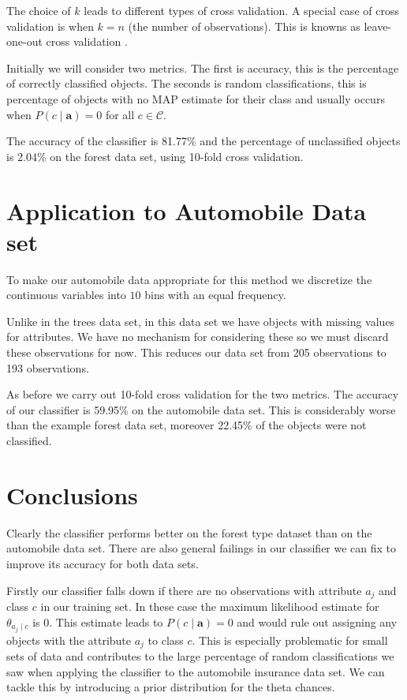 The choice of $k$ leads to different types of cross validation.
A special case of cross validation is when $k=n$ (the number of observations).
This is knowns as leave-one-out cross validation \cite{Priddy05}.

Initially we will consider two metrics.
The first is accuracy, this is the percentage of correctly classified objects.
The seconds is random classifications, this is percentage of objects with no MAP estimate for their class and usually occurs when $P(c \mid \mathbf{a}) = 0$ for all $c \in \mathcal{C}$.

The accuracy of the classifier is 81.77\% and the percentage of unclassified objects is 2.04\% on the forest data set, using 10-fold cross validation.

\section{Application to Automobile Data set}

To make our automobile data appropriate for this method we discretize the continuous variables into $10$ bins with an equal frequency.

Unlike in the trees data set, in this data set we have objects with missing values for attributes.
We have no mechanism for considering these so we must discard these observations for now.
This reduces our data set from 205 observations to 193 observations.

As before we carry out 10-fold cross validation for the two metrics.
The accuracy of our classifier is 59.95\% on the automobile data set.
This is considerably worse than the example forest data set, moreover 22.45\% of the objects were not classified.

\section{Conclusions}

Clearly the classifier performs better on the forest type dataset than on the automobile data set.
There are also general failings in our classifier we can fix to improve its accuracy for both data sets.

Firstly our classifier falls down if there are no observations with attribute $a_j$ and class $c$ in our training set.
In these case the maximum likelihood estimate for $\theta_{a_j \mid c}$ is $0$.
This estimate leads to $P(c \mid \mathbf{a}) = 0$ and would rule out assigning any objects with the attribute $a_j$ to class $c$.
This is especially problematic for small sets of data and contributes to the large percentage of random classifications we saw when applying the classifier to the automobile insurance data set.
We can tackle this by introducing a prior distribution for the theta chances.


